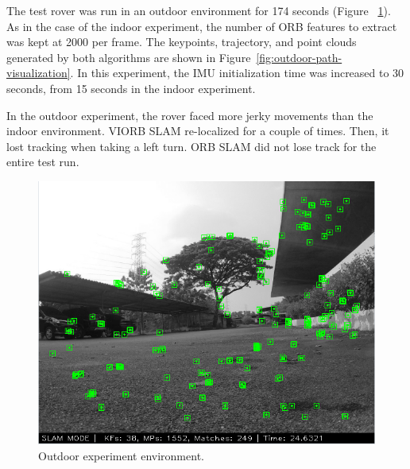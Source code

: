 The test rover was run in an outdoor environment for 174 seconds (Figure ~\ref{fig:outdoor-experiment-live}). As in the case of the indoor experiment, the number of ORB 
features to extract was kept at 2000 per frame. The keypoints, trajectory, and point clouds generated by both algorithms are shown in Figure~\ref{fig:outdoor-path-visualization}. In this experiment, the IMU initialization time was increased to 30 seconds, from 15 seconds in the indoor experiment.

In the outdoor experiment, the rover faced more jerky movements than the 	indoor environment. VIORB SLAM re-localized for a couple of times. Then, it lost tracking when taking a left turn. ORB SLAM did not lose track for the entire test run.

\begin{figure}[h]
	\centering
	\includegraphics[width=5.5in]{figures/demo3_screen}
	\caption[Outdoor experiment environment]{\small 
		Outdoor experiment environment. }
	\label{fig:outdoor-experiment-live}
\end{figure}



